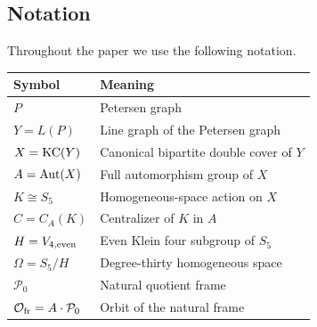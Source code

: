 \subsection{Notation}

Throughout the paper we use the following notation.

\begin{center}
\begin{tabular}{ll}
\toprule
Symbol & Meaning\\
\midrule
\(P\) & Petersen graph\\
\(Y=L(P)\) & Line graph of the Petersen graph\\
\(X=\operatorname{KC}(Y)\) & Canonical bipartite double cover of \(Y\)\\
\(A=\operatorname{Aut}(X)\) & Full automorphism group of \(X\)\\
\(K\cong S_5\) & Homogeneous-space action on \(X\)\\
\(C=C_A(K)\) & Centralizer of \(K\) in \(A\)\\
\(H=V_{4,\mathrm{even}}\) & Even Klein four subgroup of \(S_5\)\\
\(\Omega=S_5/H\) & Degree-thirty homogeneous space\\
\(\mathcal P_0\) & Natural quotient frame\\
\(\mathcal O_{\mathrm{fr}}=A\cdot\mathcal P_0\) & Orbit of the natural frame\\
\bottomrule
\end{tabular}
\end{center}
